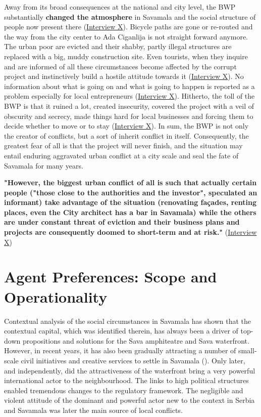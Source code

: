 \documentclass[11pt]{report}
\begin{document}
{{{{Away from its broad consequences at the national and city level, the BWP substantially \textbf{changed the atmosphere} in Savamala and the social structure of people now present there
(\href{InterviewX}{Interview X}).
Bicycle paths are gone or re-routed and the way from the city center to Ada Ciganlija is not straight forward anymore. The urban poor are evicted and their shabby, partly illegal structures are replaced with a big, muddy construction site. Even tourists, when they inquire and are informed of all these circumstances become affected by the corrupt project and instinctively build a hostile attitude towards it 
(\href{InterviewX}{Interview X}).
No information about what is going on and what is going to happen is reported as a problem especially for local entrepreneurs
(\href{InterviewX}{Interview X}).
Hitherto, the toll of the BWP is that it ruined a lot, created insecurity, covered the project with a veil of obscurity and secrecy, made things hard for local businesses and forcing them to decide whether to move or to stay
(\href{InterviewX}{Interview X}).
In sum, the BWP is not only the creator of conflicts, but a sort of inherit conflict in itself. Consequently, the greatest fear of all is that the project will never finish, and the situation may entail enduring aggravated urban conflict at a city scale and seal the fate of Savamala for many years.

\textbf{"However, the biggest urban conflict of all is such that actually certain people ("those close to the authorities and the investor", speculated an informant)  take advantage of the situation (renovating façades, renting places, even the City architect has a bar in Savamala) while the others are under constant threat of eviction and their business plans and projects are consequently doomed to short-term and at risk."} (\href{InterviewX}{Interview X})

\section{Agent Preferences: Scope and Operationality}

Contextual analysis of the social circumstances in Savamala has shown that the contextual capital, which was identified therein, has always been a driver of top-down propositions and solutions for the Sava amphiteatre and Sava waterfront. However, in recent years, it has also been gradually attracting a number of small-scale civil initiatives and creative services to settle in Savamala (\href{ref}{\citealt{cvetinovic_engine_2013}}).
Only later, and independently, did the attractiveness of the waterfront bring a very powerful international actor to the neighbourhood. The links to high political structures enabled tremendous changes to the regulatory framework. The negligible and violent attitude of the dominant and powerful actor new to the context in Serbia and Savamala was later the main source of local conflicts.
\\

}}}}
\end{document}

